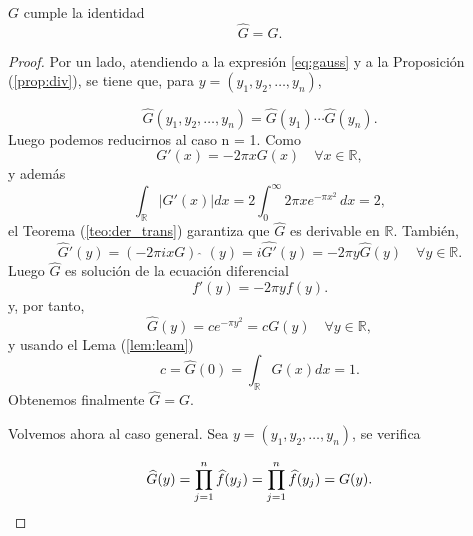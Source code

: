 \begin{proposicion}
    $G$ cumple la identidad 
    \begin{equation}
        \widehat{G} = G.
    \end{equation}
\end{proposicion}




\begin{proof}
Por un lado, atendiendo a la expresión \eqref{eq:gauss} y a la Proposición (\ref{prop:div}), se tiene que, para $y = (y_1,y_2, \ldots, y_n)$,

\begin{equation}
    \widehat{G}(y_1,y_2, \ldots, y_n) = \widehat{G}(y_1) \cdots \widehat{G}(y_n). 
\end{equation}
\noindent Luego podemos reducirnos al caso n = 1.
\noindent Como 
\begin{equation}
    G'(x) = -2 \pi x G(x) \quad \forall x \in \mathbb{R},
\end{equation}
y además 
\begin{equation}
    \int_{\mathbb{R}}|G'(x)|dx = 2\int_0^\infty 2\pi x e^{-\pi x^2} \, dx = 2,
\end{equation}
\noindent el Teorema (\ref{teo:der_trans}) garantiza que $\widehat{G}$ es derivable en $\mathbb{R}$. También, 
\begin{equation}
    \widehat{G}'(y) = (-2 \pi i x G) \, \, \widehat{}\, \, (y) = i\widehat{G'}(y) = -2\pi y\widehat{G}(y) \quad \forall y \in \mathbb{R}.
\end{equation}
Luego $\widehat{G}$ es solución de la ecuación diferencial 
\begin{equation}
    f'(y) = -2\pi y f(y).
\end{equation}y, por tanto, 
\begin{equation}
    \widehat{G}(y) = ce^{-\pi y^2} = c G(y) \quad \forall y \in \mathbb{R},
\end{equation}
y usando el Lema (\ref{lem:leam})
\begin{equation}
    c = \widehat{G}(0) = \int_{\mathbb{R}}G(x) dx = 1.
\end{equation}
Obtenemos finalmente $\widehat{G} = G$.


\noindent Volvemos ahora al caso general. Sea  $y = (y_1,y_2,  \ldots, y_n)$,  se verifica

\begin{equation*}
        \widehat{G}(y) =  \prod_{j=1}^{n}\widehat{f}(y_j) =  \prod_{j=1}^{n}\widehat{f}(y_j)  = G(y). \qedhere
\end{equation*} 
\end{proof}


